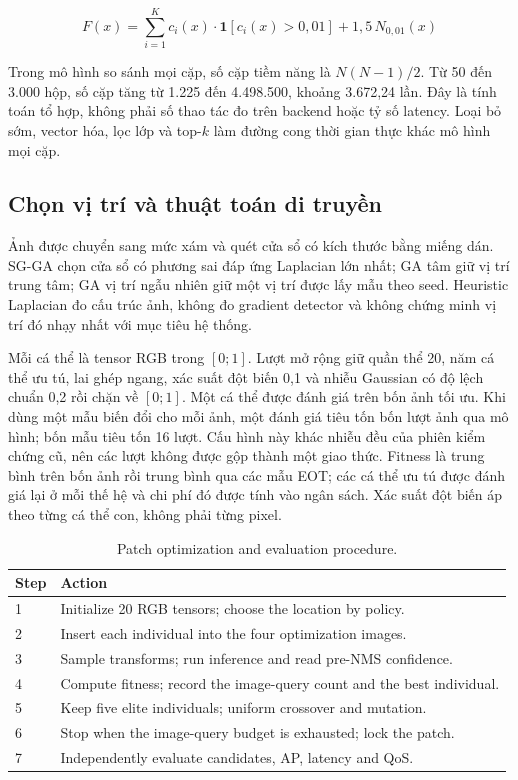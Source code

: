 \documentclass[a4paper,fleqn]{cas-dc}
\begin{document}
\begin{equation}
F(x) = \sum_{i=1}^{K} c_i(x)\cdot\mathbf{1}[c_i(x) > 0{,}01] + 1{,}5\,N_{0{,}01}(x)
\tag{2}
\end{equation}

Trong mô hình so sánh mọi cặp, số cặp tiềm năng là $N(N{-}1)/2$. Từ 50 đến 3.000 hộp, số cặp tăng từ 1.225 đến 4.498.500, khoảng 3.672,24 lần. Đây là tính toán tổ hợp, không phải số thao tác đo trên backend hoặc tỷ số latency. Loại bỏ sớm, vector hóa, lọc lớp và top-$k$ làm đường cong thời gian thực khác mô hình mọi cặp.

\subsection{Chọn vị trí và thuật toán di truyền}

Ảnh được chuyển sang mức xám và quét cửa sổ có kích thước bằng miếng dán. SG-GA chọn cửa sổ có phương sai đáp ứng Laplacian lớn nhất; GA tâm giữ vị trí trung tâm; GA vị trí ngẫu nhiên giữ một vị trí được lấy mẫu theo seed. Heuristic Laplacian đo cấu trúc ảnh, không đo gradient detector và không chứng minh vị trí đó nhạy nhất với mục tiêu hệ thống.

Mỗi cá thể là tensor RGB trong $[0;1]$. Lượt mở rộng giữ quần thể 20, năm cá thể ưu tú, lai ghép ngang, xác suất đột biến 0,1 và nhiễu Gaussian có độ lệch chuẩn 0,2 rồi chặn về $[0;1]$. Một cá thể được đánh giá trên bốn ảnh tối ưu. Khi dùng một mẫu biến đổi cho mỗi ảnh, một đánh giá tiêu tốn bốn lượt ảnh qua mô hình; bốn mẫu tiêu tốn 16 lượt. Cấu hình này khác nhiễu đều của phiên kiểm chứng cũ, nên các lượt không được gộp thành một giao thức. Fitness là trung bình trên bốn ảnh rồi trung bình qua các mẫu EOT; các cá thể ưu tú được đánh giá lại ở mỗi thế hệ và chi phí đó được tính vào ngân sách. Xác suất đột biến áp theo từng cá thể con, không phải từng pixel.

\begin{table}[t]
\centering
\small
\caption{Patch optimization and evaluation procedure.}
\begin{tabularx}{\textwidth}{@{}X X @{}}
\toprule
\textbf{Step} & \textbf{Action} \\
\midrule
1 & Initialize 20 RGB tensors; choose the location by policy. \\
2 & Insert each individual into the four optimization images. \\
3 & Sample transforms; run inference and read pre-NMS confidence. \\
4 & Compute fitness; record the image-query count and the best individual. \\
5 & Keep five elite individuals; uniform crossover and mutation. \\
6 & Stop when the image-query budget is exhausted; lock the patch. \\
7 & Independently evaluate candidates, AP, latency and QoS. \\
\bottomrule
\end{tabularx}
\label{tab:algorithm}
\end{table}
\end{document}
